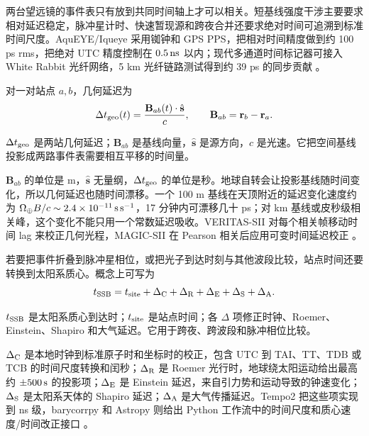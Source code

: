 两台望远镜的事件表只有放到共同时间轴上才可以相关。短基线强度干涉主要要求相对延迟稳定，脉冲星计时、快速暂现源和跨夜合并还要求绝对时间可追溯到标准时间尺度。AquEYE/Iqueye 采用铷钟和 GPS PPS，把相对时间精度做到约 100 ps rms，把绝对 UTC 精度控制在 \(0.5\,{\rm ns}\) 以内；现代多通道时间标记器可接入 White Rabbit 光纤网络，5 km 光纤链路测试得到约 39 ps 的同步贡献 \citep{2009A&A...508..531N,2015SPIE.9504E..0CZ,2013NIMPA.725..187J,2020RScI...91a3108W}。

对一对站点 \(a,b\)，几何延迟为
\begin{equation}
  \Delta t_{\rm geo}(t)
  =
  \frac{\mathbf{B}_{ab}(t)\cdot\hat{\mathbf{s}}}{c},
  \qquad
  \mathbf{B}_{ab}=\mathbf{r}_b-\mathbf{r}_a .
  \label{eq:ch06-geometric-delay}
\end{equation}
\begin{formulaexplain}
\(\Delta t_{\rm geo}\) 是两站几何延迟；\(\mathbf B_{ab}\) 是基线向量，\(\hat{\mathbf s}\) 是源方向，\(c\) 是光速。它把空间基线投影成两路事件表需要相互平移的时间量。
\end{formulaexplain}
\(\mathbf{B}_{ab}\) 的单位是 m，\(\hat{\mathbf{s}}\) 无量纲，\(\Delta t_{\rm geo}\) 的单位是秒。地球自转会让投影基线随时间变化，所以几何延迟也随时间漂移。一个 100 m 基线在天顶附近的延迟变化速度约为 \(\Omega_\oplus B/c\sim2.4\times10^{-11}\,{\rm s\,s^{-1}}\)，17 分钟内可漂移几十 ps；对 km 基线或皮秒级相关峰，这个变化不能只用一个常数延迟吸收。VERITAS-SII 对每个相关帧移动时间 lag 来校正几何光程，MAGIC-SII 在 Pearson 相关后应用可变时间延迟校正 \citep{2020NatAs...4.1164A,2024MNRAS.529.4387A}。

若要把事件折叠到脉冲星相位，或把光子到达时刻与其他波段比较，站点时间还要转换到太阳系质心。概念上可写为
\begin{equation}
  t_{\rm SSB}
  =
  t_{\rm site}
  +\Delta_{\rm C}
  +\Delta_{\rm R}
  +\Delta_{\rm E}
  +\Delta_{\rm S}
  +\Delta_{\rm A}.
  \label{eq:ch06-barycentric-time}
\end{equation}
\begin{formulaexplain}
\(t_{\rm SSB}\) 是太阳系质心到达时；\(t_{\rm site}\) 是站点时间；各 \(\Delta\) 项修正时钟、Roemer、Einstein、Shapiro 和大气延迟。它用于跨夜、跨波段和脉冲相位比较。
\end{formulaexplain}
\(\Delta_{\rm C}\) 是本地时钟到标准原子时和坐标时的校正，包含 UTC 到 TAI、TT、TDB 或 TCB 的时间尺度转换和闰秒；\(\Delta_{\rm R}\) 是 Roemer 光行时，地球绕太阳运动给出最高约 \(\pm500\,{\rm s}\) 的投影项；\(\Delta_{\rm E}\) 是 Einstein 延迟，来自引力势和运动导致的钟速变化；\(\Delta_{\rm S}\) 是太阳系天体的 Shapiro 延迟；\(\Delta_{\rm A}\) 是大气传播延迟。Tempo2 把这些项实现到 ns 级，barycorrpy 和 Astropy 则给出 Python 工作流中的时间尺度和质心速度/时间改正接口 \citep{2006MNRAS.369..655H,2006MNRAS.372.1549E,2018RNAAS...2....4K,2013A&A...558A..33A,2018AJ....156..123A}。

